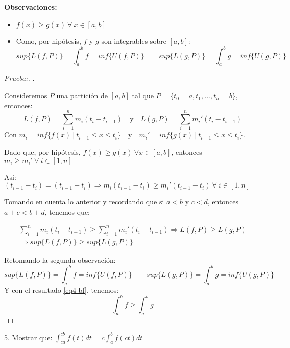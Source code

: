 \documentclass[12pt]{article}
\begin{document}
\begin{enumerate}[\hspace{9px} a)]
        \textbf{Observaciones: }
        \begin{itemize}
            \item \(f(x) \geq g(x) \ \forall \ x \in [a,b]\)
            \item Como, por hip\'otesis, $f$ y $g$ son integrables sobre $[a,b]$: \[sup\{L(f,P)\}=\int_{a}^{b}f=inf\{U(f,P)\} \qquad sup\{L(g,P)\}=\int_{a}^{b}g=inf\{U(g,P)\}\]
        \end{itemize}

        \begin{proof}[Prueba:]
            . \medskip

            Consideremos $P$ una partici\'on de $[a,b]$ tal que \(P=\{t_0=a,t_1,...,t_n=b\}\), entonces:
            \[L(f,P) = \sum_{i=1}^n m_i(t_i-t_{i-1}) \quad \text{y} \quad L(g,P) = \sum_{i=1}^n m_i'(t_i-t_{i-1})\]
            Con \(m_i=inf\{f(x) \ | \ t_{i-1} \leq x \leq t_i\} \quad \text{y} \quad m_i'=inf\{g(x) \ | \ t_{i-1} \leq x \leq t_i\}\).\medskip

            Dado que, por hip\'otesis, \(f(x)\geq g(x) \ \forall x \in [a,b]\), entonces \(m_i \geq m_i' \ \forall \ i \in [1,n]\)\medskip

            Asi: \qquad \((t_{i-1}-t_i)=(t_{i-1}-t_i) \Longrightarrow m_i(t_{i-1}-t_i)\geq m_i'(t_{i-1}-t_i) \ \forall \ i \in [1,n]\)

            Tomando en cuenta lo anterior y recordando que si \(a<b\) y \(c<d\), entonces \(a+c<b+d\), tenemos que:

            \begin{multline}
                \label{eq4-bf}
                \sum_{i=1}^n m_i(t_i-t_{i-1})\geq\sum_{i=1}^n m_i'(t_i-t_{i-1}) \Longrightarrow L(f,P)\geq L(g,P) \\ \Longrightarrow sup\{L(f,P)\}\geq sup\{L(g,P)\}
            \end{multline}

            Retomando la segunda observaci\'on: \[sup\{L(f,P)\}=\int_{a}^{b}f=inf\{U(f,P)\} \qquad sup\{L(g,P)\}=\int_{a}^{b}g=inf\{U(g,P)\}\]
            Y con el resultado \eqref{eq4-bf}, tenemos:
            \[\int_{a}^{b}f\geq\int_{a}^{b}g\]
        \end{proof}

\end{enumerate}

5. Mostrar que: \quad \(\displaystyle\int_{ca}^{cb}f(t)dt=c\displaystyle\int_{a}^{b}f(ct)dt\)
\end{document}
